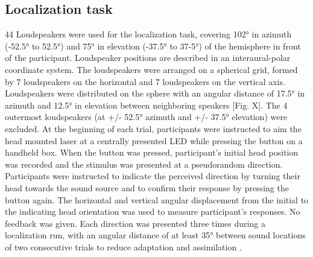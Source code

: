 \subsection{Localization task} 
44 Loudspeakers were used for the localization task, covering 102° in azimuth (-52.5° to 52.5°) and 75° in elevation (-37.5° to 37-5°) of the hemisphere in front of the participant. Loudspeaker positions are described in an interaural-polar coordinate system. The loudspeakers were arranged on a spherical grid, formed by 7 loudspeakers on the horizontal and 7 loudspeakers on the vertical axis. Loudspeakers were distributed on the sphere with an angular distance of 17.5° in azimuth and 12.5° in elevation between neighboring speakers [Fig. X]. The 4 outermost loudspeakers (at +/- 52.5° azimuth and +/- 37.5° elevation) were excluded. At the beginning of each trial, participants were instructed to aim the head mounted laser at a centrally presented LED while pressing the button on a handheld box. When the button was pressed, participant’s initial head position was recorded and the stimulus was presented at a pseudorandom direction. Participants were instructed to indicate the perceived direction by turning their head towards the sound source and to confirm their response by pressing the button again. The horizontal and vertical angular displacement from the initial to the indicating head orientation was used to measure participant’s responses. No feedback was given. Each direction was presented three times during a localization run, with an angular distance of at least 35° between sound locations of two consecutive trials to reduce adaptation and assimilation \citep{ward_stimulus_1979}. 

